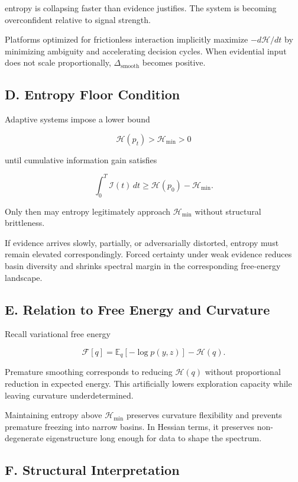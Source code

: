 \documentclass[11pt]{article}
\theoremstyle{remark}
\begin{document}
entropy is collapsing faster than evidence justifies. The system is becoming overconfident relative to signal strength.

Platforms optimized for frictionless interaction implicitly maximize $-d\mathcal{H}/dt$ by minimizing ambiguity and accelerating decision cycles. When evidential input does not scale proportionally, $\Delta_{\text{smooth}}$ becomes positive.

\subsection*{D. Entropy Floor Condition}

Adaptive systems impose a lower bound

\[
\mathcal{H}(p_t) > \mathcal{H}_{\min} > 0
\]

until cumulative information gain satisfies

\[
\int_0^T \mathcal{I}(t)\, dt
\ge
\mathcal{H}(p_0) - \mathcal{H}_{\min}.
\]

Only then may entropy legitimately approach $\mathcal{H}_{\min}$ without structural brittleness.

If evidence arrives slowly, partially, or adversarially distorted, entropy must remain elevated correspondingly. Forced certainty under weak evidence reduces basin diversity and shrinks spectral margin in the corresponding free-energy landscape.

\subsection*{E. Relation to Free Energy and Curvature}

Recall variational free energy

\[
\mathcal{F}[q]
=
\mathbb{E}_{q}[-\log p(y,z)]
-
\mathcal{H}(q).
\]

Premature smoothing corresponds to reducing $\mathcal{H}(q)$ without proportional reduction in expected energy. This artificially lowers exploration capacity while leaving curvature underdetermined.

Maintaining entropy above $\mathcal{H}_{\min}$ preserves curvature flexibility and prevents premature freezing into narrow basins. In Hessian terms, it preserves non-degenerate eigenstructure long enough for data to shape the spectrum.

\subsection*{F. Structural Interpretation}
\end{document}
